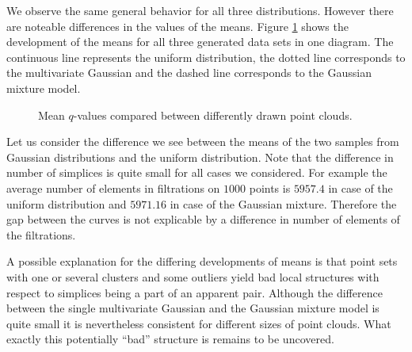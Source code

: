 We observe the same general behavior for all three distributions. However there are noteable differences in the values of the means. Figure \ref{fig:2d_all_compared} shows the development of the means for all three generated data sets in one diagram. The continuous line represents the uniform distribution, the dotted line corresponds to the multivariate Gaussian and the dashed line corresponds to the Gaussian mixture model.

\begin{figure}[H]

\begin{subfigure}[c]{0.99\textwidth}
\begin{center}


\end{center}
\end{subfigure}


%

\caption{Mean $q$-values compared between differently drawn point clouds.}
\label{fig:2d_all_compared}
\end{figure}

Let us consider the difference we see between the means of the two samples from Gaussian distributions and the uniform distribution. Note that the difference in number of simplices is quite small for all cases we considered. For example the average number of elements in filtrations on $1000$ points is $5957.4$ in case of the uniform distribution and $5971.16$ in case of the Gaussian mixture. Therefore the gap between the curves is not explicable by a difference in number of elements of the filtrations. 

A possible explanation for the differing developments of means is that point sets with one or several clusters and some outliers yield bad local structures with respect to simplices being a part of an apparent pair. Although the difference between the single multivariate Gaussian and the Gaussian mixture model is quite small it is nevertheless consistent for different sizes of point clouds. What exactly this potentially \enquote{bad} structure is remains to be uncovered.

